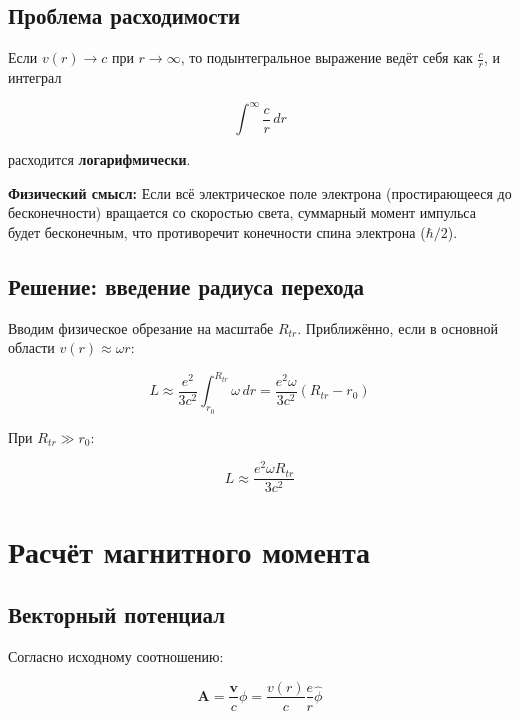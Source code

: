 \documentclass[12pt,a4paper]{article}
\begin{document}
\subsection{Проблема расходимости}

Если $v(r) \to c$ при $r \to \infty$, то подынтегральное выражение ведёт себя как $\frac{c}{r}$, и интеграл

\begin{equation}
    \int^{\infty} \frac{c}{r} \, dr
\end{equation}

расходится \textbf{логарифмически}.

\textbf{Физический смысл:} Если всё электрическое поле электрона (простирающееся до бесконечности) вращается со скоростью света, суммарный момент импульса будет бесконечным, что противоречит конечности спина электрона ($\hbar/2$).

\subsection{Решение: введение радиуса перехода}

Вводим физическое обрезание на масштабе $R_{tr}$. Приближённо, если в основной области $v(r) \approx \omega r$:

\begin{equation}
    L \approx \frac{e^2}{3 c^2} \int_{r_0}^{R_{tr}} \omega \, dr = \frac{e^2 \omega}{3 c^2} (R_{tr} - r_0)
\end{equation}

При $R_{tr} \gg r_0$:

\begin{equation}
    L \approx \frac{e^2 \omega R_{tr}}{3 c^2}
\end{equation}

\section{Расчёт магнитного момента}

\subsection{Векторный потенциал}

Согласно исходному соотношению:

\begin{equation}
    \mathbf{A} = \frac{\mathbf{v}}{c} \phi = \frac{v(r)}{c} \frac{e}{r} \hat{\phi}
\end{equation}
\end{document}
